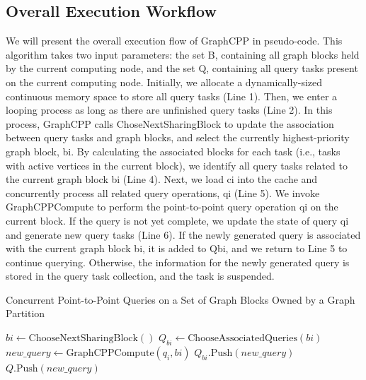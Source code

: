 \documentclass[lettersize,journal]{IEEEtran} %
\begin{document}
\subsection{Overall Execution Workflow}
We will present the overall execution flow of GraphCPP in pseudo-code. This algorithm takes two input parameters: the set B, containing all graph blocks held by the current computing node, and the set Q, containing all query tasks present on the current computing node. Initially, we allocate a dynamically-sized continuous memory space to store all query tasks (Line 1). Then, we enter a looping process as long as there are unfinished query tasks (Line 2). In this process, GraphCPP calls ChoseNextSharingBlock to update the association between query tasks and graph blocks, and select the currently highest-priority graph block, bi. By calculating the associated blocks for each task (i.e., tasks with active vertices in the current block), we identify all query tasks related to the current graph block bi (Line 4). Next, we load ci into the cache and concurrently process all related query operations, qi (Line 5). We invoke GraphCPPCompute to perform the point-to-point query operation qi on the current block. If the query is not yet complete, we update the state of query qi and generate new query tasks (Line 6). If the newly generated query is associated with the current graph block bi, it is added to Qbi, and we return to Line 5 to continue querying. Otherwise, the information for the newly generated query is stored in the query task collection, and the task is suspended.

\begin{algorithm}
  \caption{Concurrent Point-to-Point Queries on a Set of Graph Blocks Owned by a Graph Partition}
  \label{algorithm:concurrent-queries}
  \begin{algorithmic}[1]
   
          \State $bi \gets \text{ChooseNextSharingBlock}()$
          \State $Q_{bi} \gets \text{ChooseAssociatedQueries}(bi)$
           
              \State $new\_query \gets \text{GraphCPPCompute}(q_i, bi)$ 
                  \State $Q_{bi}.\text{Push}(new\_query)$
              \Else
                  \State $Q.\text{Push}(new\_query)$
              \EndIf
          \EndFor
      \EndWhile
  \EndProcedure
  \end{algorithmic}
  \end{algorithm}
  
\end{document}
